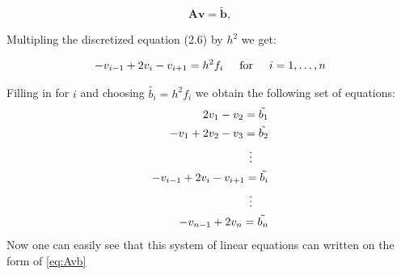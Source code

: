 \documentclass[11pt,a4paper,english,final]{article}
\numberwithin{equation}{section}
\newcommand{\ve}[1]{\mathbf{#1}} %
\begin{document}
\begin{equation}
   \ve{A}\ve{v} = \tilde{\ve{b}},
   \label{eq:Avb}
\end{equation}

Multipling the discretized equation (2.6) by $h^2$ we get:

\begin{gather*}
   -v_{i-1}+2v_{i}-v_{i+1}=h^2 f_i \hspace{0.5cm} \mathrm{for} \hspace{0.5cm} i=1,\dots, n 
\end{gather*}

Filling in for $i$ and choosing $\tilde{b_i} = h^2 f_i$ we obtain the following set of equations: 
\begin{align*}
	2v_{1}-v_{2}=\tilde{b_1} \\
	-v_{1}+2v_{2}-v_{3}=\tilde{b_2} \\
	\vdots \hspace{0.5cm} \\
	-v_{i-1}+2v_{i}-v_{i+1}=\tilde{b_i} \\
	\vdots \hspace{0.5cm}  \\ 
	-v_{n-1}+2v_{n}=\tilde{b_n} \\
\end{align*}
Now one can easily see that this system of linear equations can written on the form of \eqref{eq:Avb}
\end{document}
